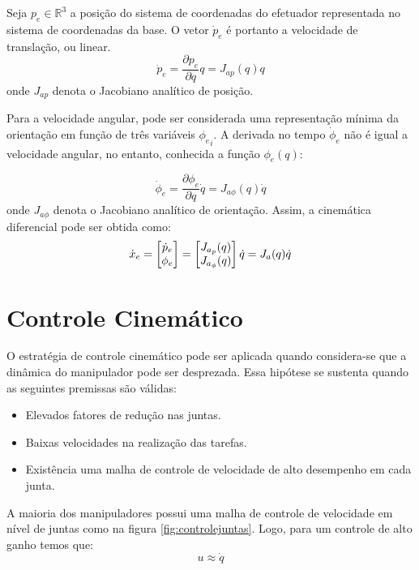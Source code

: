 Seja ${p}_e \in \mathbb{R}^3$ a posição do sistema de coordenadas do efetuador representada no sistema de coordenadas da base. O vetor $\dot{{p}}_e$ é portanto a velocidade de translação, ou linear.
\begin{equation} \label{eq:jacob_pos}
\dot{{p}}_e = \frac{\partial {p}_e }{\partial {q}} {{q}} = {J}_{ap} ({q}) {{q}} 
\end{equation}
onde ${J}_{ap}$ denota o Jacobiano analítico de posição.

Para a velocidade angular, pode ser considerada uma representação mínima da orientação em função de três variáveis ${\phi_e}_i$. 
A derivada no tempo $\dot{{\phi}}_e$ não é igual a velocidade angular, no entanto, conhecida a função ${\phi}_e({q})$:

\begin{equation} \label{eq:jacob_or}
\dot{{\phi}}_e = \frac{\partial {\phi}_e}{\partial {q}} {\dot{q}} = {J}_{a\phi}({q}){\dot{q}}
\end{equation}
onde ${J}_{a\phi}$ denota o Jacobiano analítico de orientação. Assim, a cinemática diferencial pode ser obtida como:
\begin{equation} \label{eq:jacoba}
\dot{x}_e = \begin{bmatrix} \dot{p}_e \\ \phi_e \end{bmatrix} = \begin{bmatrix} J_{a_p}(q) \\ J_{a_\phi}(q)\end{bmatrix} {\dot{q}} = {J}_a ({q}) \dot{{q}}
\end{equation}

 
\section{Controle Cinemático} \label{sec:controle_cinematico}
O estratégia de controle cinemático pode ser aplicada quando considera-se que a dinâmica do manipulador pode ser desprezada. Essa hipótese se sustenta quando as seguintes premissas são válidas:
\begin{itemize}
\item Elevados fatores de redução nas juntas.
\item Baixas velocidades na realização das tarefas.
\item Existência uma malha de controle de velocidade de alto desempenho em cada junta.
\end{itemize}

A maioria dos manipuladores possui uma malha de controle de velocidade em nível de juntas como na figura \ref{fig:controlejuntas}. Logo, para um controle de alto ganho temos que:
\[ {u} \approx \dot{{q}}\]

